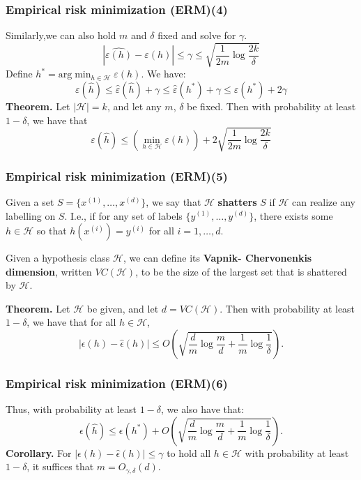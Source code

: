 \documentclass[slidestop,compress,mathserif]{beamer}
\begin{document}
	\begin{frame}
		\frametitle{Empirical risk minimization (ERM)(4)}
		Similarly,we can also hold $m$ and $\delta$ fixed and solve
		for $\gamma$.
		$$|\hat{\varepsilon(h)}-\varepsilon(h)| \le \gamma \le \sqrt{
		\frac{1}{2m}\log\frac{2k}{\delta}}$$
		Define $h^*=\mathrm{arg}\min_{h\in \mathcal{H}}\varepsilon(h)$.
		We have:
			$$\varepsilon(\hat{h}) \le \hat{\varepsilon}(\hat{h})+\gamma
			\le \hat{\varepsilon}(h^*)+\gamma \le \varepsilon(h^*)+2\gamma $$ 
		\textbf{Theorem.} Let $|\mathcal{H}|=k$, and let any $m$, 
		$\delta$ be fixed. Then with probability at least $1-\delta$,
		we have that
		$$\varepsilon(\hat{h})\le \left(\min_{h \in \mathcal{H}}
		\varepsilon(h)\right)+2\sqrt{\frac{1}{2m}\log\frac{2k}{\delta}}$$
	\end{frame}
	\begin{frame}
		\frametitle{Empirical risk minimization (ERM)(5)}
		Given a set $S=\{x^{(1)},\ldots,x^{(d)}\}$, we say that $\mathcal{H}$
		\textbf{shatters} $S$ if $\mathcal{H}$ can realize any labelling
		on $S$. I.e., if for any set of labels $\{y^{(1)},\ldots,
		y^{(d)}\}$, there exists some $h\in\mathcal{H}$ so that
		$h(x^{(i)})=y^{(i)}$ for all $i=1,\ldots,d$. 
		
		Given a hypothesis class $\mathcal{H}$, we can define its
		\textbf{Vapnik- Chervonenkis dimension}, written $VC(\mathcal{H})$,
		to be the size of the largest set that is shattered by $\mathcal{H}$.
		
		\textbf{Theorem.} Let $\mathcal{H}$ be given, and let $d = 
		VC(\mathcal{H})$. Then with probability at least $1-\delta$, 
		we have that for all $h\in\mathcal{H}$,
		$$|\epsilon(h)-\hat{\epsilon}(h)| \le O\left(\sqrt{
		\frac{d}{m}\log{\frac{m}{d}}+\frac{1}{m}\log\frac{1}{\delta}}
		\right).$$
	\end{frame}	
	\begin{frame}
		\frametitle{Empirical risk minimization (ERM)(6)}
		Thus, with probability at least $1-\delta$, we also have that:
		$$\epsilon(\hat{h})\le \epsilon(h^*)+O\left(\sqrt{
		\frac{d}{m}\log{\frac{m}{d}}+\frac{1}{m}\log\frac{1}{\delta}}
		\right).$$
		\textbf{Corollary.} For $|\epsilon(h)-\hat{\epsilon}(h)|\le 
		\gamma$ to hold all $h\in\mathcal{H}$ with probability at 
		least $1-\delta$, it suffices that $m=O_{\gamma,\delta}(d)$.
	\end{frame}						   
\end{document}
